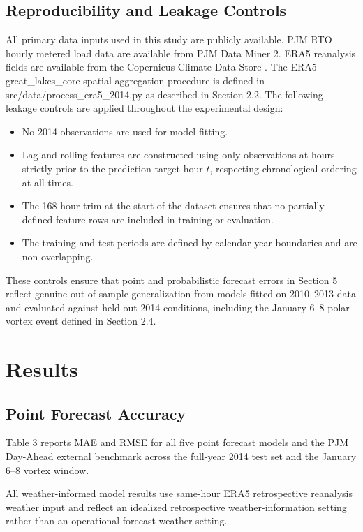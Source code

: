 \documentclass[12pt,a4paper]{article}
\begin{document}
\subsection{Reproducibility and Leakage Controls}
All primary data inputs used in this study are publicly available. PJM RTO hourly metered load data are available from PJM Data Miner 2. ERA5 reanalysis fields are available from the Copernicus Climate Data Store \cite{hersbach2020era5}. The ERA5 great\_lakes\_core spatial aggregation procedure is defined in src/data/process\_era5\_2014.py as described in Section 2.2.
The following leakage controls are applied throughout the experimental design:

\begin{itemize}[leftmargin=*, itemsep=2pt]
    \item No 2014 observations are used for model fitting.
    \item Lag and rolling features are constructed using only observations at hours strictly prior to the prediction target hour $t$, respecting chronological ordering at all times.
    \item The 168-hour trim at the start of the dataset ensures that no partially defined feature rows are included in training or evaluation.
    \item The training and test periods are defined by calendar year boundaries and are non-overlapping.
\end{itemize}


These controls ensure that point and probabilistic forecast errors in Section 5 reflect genuine out-of-sample generalization from models fitted on 2010–2013 data and evaluated against held-out 2014 conditions, including the January 6–8 polar vortex event defined in Section 2.4.

\section{Results}
\subsection{Point Forecast Accuracy}
Table 3 reports MAE and RMSE for all five point forecast models and the PJM Day-Ahead external benchmark across the full-year 2014 test set and the January 6–8 vortex window. 

All weather-informed model results use same-hour ERA5 retrospective reanalysis weather input and reflect an idealized retrospective weather-information setting rather than an operational forecast-weather setting.
\end{document}
